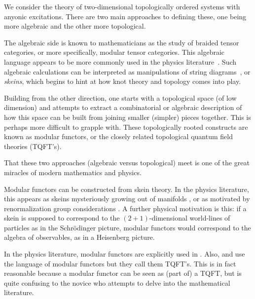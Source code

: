 \documentclass[aps, prl, letterpaper, twocolumn, superscriptaddress, notitlepage, 10pt]{revtex4-1}
\begin{document}
%
%

We consider the theory of two-dimensional topologically ordered systems
with anyonic excitations.
There are two main approaches to defining these,
one being more algebraic and the other more topological.

The algebraic side is known to mathematicians as the study of braided
tensor categories, or more specifically, modular tensor categories.
This algebraic language appears to be more commonly used 
in the physics literature~\cite{Kitaev2006}.
Such algebraic calculations can be interpreted as
manipulations of string diagrams~\cite{Baez2010},
or \emph{skeins}, which begins to hint at
how knot theory and topology comes into play.

Building from the other direction, one starts with
a topological space (of low dimension) and attempts
to extract a combinatorial or algebraic description of how this
space can be built from joining smaller (simpler) pieces together.
This is perhaps more difficult to grapple with.
These topologically rooted constructs are known as modular functors, 
or the closely related topological quantum field theories (TQFT's).

That these two approaches (algebraic versus topological)
meet is one of the great
miracles of modern mathematics and physics.


Modular functors can be constructed from skein theory.
In the physics literature, 
this appears as skeins mysteriously growing out of manifolds \cite{Pfeifer2012},
or as motivated by renormalization group considerations \cite{Levin2005}.
A further physical motivation is this: if a skein 
is supposed to correspond to the $(2+1)$-dimensional
world-lines of particles
as in the Schr\"{o}dinger picture,
modular functors would
correspond to the algebra of observables, as in
a Heisenberg picture.

In the physics literature, modular functors are
explicitly used in \cite{Freedman2002, Freedman2002simulation}.
Also, \cite{Beverland2014} and \cite{Kitaev2006topo}
use the language of modular functors but they call them TQFT's.
This is in fact reasonable because a modular functor can be
seen as (part of) a TQFT, but is quite confusing to the
novice who attempts to delve into the mathematical literature.
\end{document}
